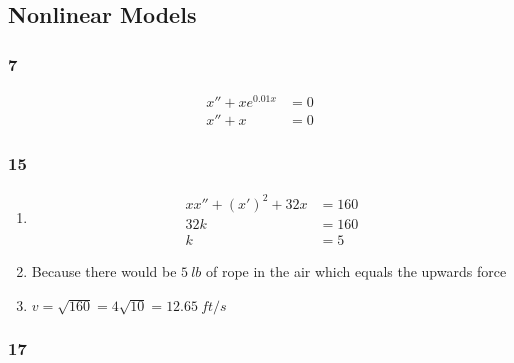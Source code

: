 \documentclass{article}
\begin{document}
\subsection{Nonlinear Models}

\subsubsection{7}

\begin{align*}
  x'' + x e^{0.01x} & = 0 \\
  x'' + x           & = 0
\end{align*}

\subsubsection{15}

\begin{enumerate}
  \item

        \begin{align*}
          x x'' + (x')^2 + 32x & = 160 \\
          32k                  & = 160 \\
          k                    & = 5
        \end{align*}

  \item Because there would be $\qty{5}{lb}$ of rope in the air which equals the upwards force

  \item $v = \sqrt{160} = 4 \sqrt{10} = \qty{12.65}{ft/s}$
\end{enumerate}

\subsubsection{17}
\end{document}
